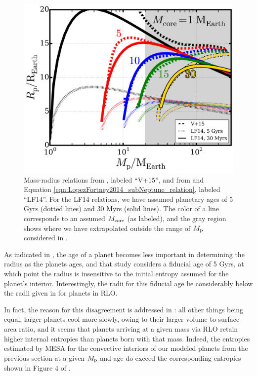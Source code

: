 \documentclass{svjour3}                     %
\begin{document}
\begin{figure}
\includegraphics[width=\textwidth]{compare_mass-radius_relations}
\caption{Mass-radius relations from \cite{2015ApJ...813..101V}, labeled ``V+15'', and from \cite{Lopez2014Understanding} and Equation \ref{eqn:LopezFortney2014_subNeptune_relation}, labeled ``LF14''. For the LF14 relations, we have assumed planetary ages of 5 Gyrs (dotted lines) and 30 Myrs (solid lines). The color of a line corresponds to an assumed $M_{\rm core}$ (as labeled), and the gray region shows where we have extrapolated outside the range of $M_{\rm p}$ considered in \cite{Lopez2014Understanding}.}
\label{fig:compare_mass-radius_relations}
\end{figure}

As indicated in \cite{2014ApJ...793L...3V}, the age of a planet becomes less important in determining the radius as the planets ages, and that study considers a fiducial age of 5 Gyrs, at which point the radius is insensitive to the initial entropy assumed for the planet's interior. Interestingly, the radii for this fiducial age lie considerably below the radii given in \cite{2015ApJ...813..101V} for planets in RLO. 

In fact, the reason for this disagreement is addressed in \cite{2014ApJ...793L...3V}: all other things being equal, larger planets cool more slowly, owing to their larger volume to surface area ratio, and it seems that planets arriving at a given mass via RLO retain higher internal entropies than planets born with that mass. Indeed, the entropies estimated by MESA for the convective interiors of our modeled planets from the previous section at a given $M_{\rm p}$ and age do exceed the corresponding entropies shown in Figure 4 of \cite{2014ApJ...793L...3V}. 
\end{document}
